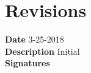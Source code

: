\documentclass[11pt]{article}
\begin{document}
\section{Revisions}
\label{sec:revisions}

\textbf{Date} 3-25-2018 \\
\textbf{Description} Initial \\
\textbf{Signatures} \\\\

\vspace*{\fill}

\begin{flushright}

\pdfcreationdate
\end{flushright}
\end{document}
